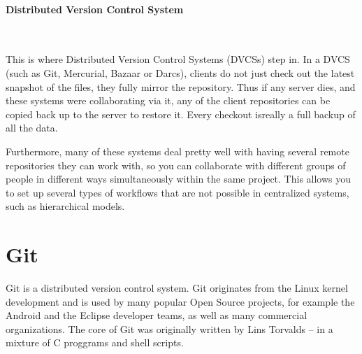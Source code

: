 \documentclass{book}
\begin{document}
    \paragraph{Distributed Version Control System} ~

    This is where Distributed Version Control Systems (DVCSs) step in. In a
DVCS (such as Git, Mercurial, Bazaar or Darcs), clients do not just
check out the latest snapshot of the files, they fully mirror the
repository. Thus if any server dies, and these systems were
collaborating via it, any of the client repositories can be copied back
up to the server to restore it. Every checkout isreally a full backup of
all the data.

    Furthermore, many of these systems deal pretty well with having several
remote repositories they can work with, so you can collaborate with
different groups of people in different ways simultaneously within the
same project. This allows you to set up several types of workflows that
are not possible in centralized systems, such as hierarchical models.

    \section*{Git}

    Git is a distributed version control system. Git originates from the
Linux kernel development and is used by many popular Open Source
projects, for example the Android and the Eclipse developer teams, as
well as many commercial organizations. The core of Git was originally
written by Lins Torvalds – in a mixture of C proggrams and shell
scripts.
\end{document}
